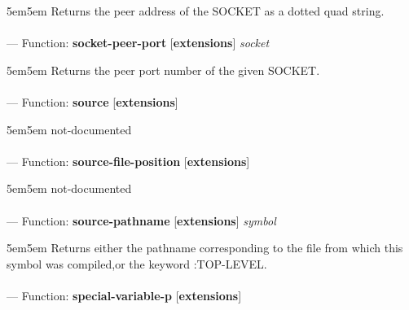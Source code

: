 \begin{adjustwidth}{5em}{5em}
Returns the peer address of the SOCKET as a dotted quad string.
\end{adjustwidth}

\paragraph{}
\label{EXTENSIONS:SOCKET-PEER-PORT}
--- Function: \textbf{socket-peer-port} [\textbf{extensions}] \textit{socket}

\begin{adjustwidth}{5em}{5em}
Returns the peer port number of the given SOCKET.
\end{adjustwidth}

\paragraph{}
\label{EXTENSIONS:SOURCE}
--- Function: \textbf{source} [\textbf{extensions}] \textit{}

\begin{adjustwidth}{5em}{5em}
not-documented
\end{adjustwidth}

\paragraph{}
\label{EXTENSIONS:SOURCE-FILE-POSITION}
--- Function: \textbf{source-file-position} [\textbf{extensions}] \textit{}

\begin{adjustwidth}{5em}{5em}
not-documented
\end{adjustwidth}

\paragraph{}
\label{EXTENSIONS:SOURCE-PATHNAME}
--- Function: \textbf{source-pathname} [\textbf{extensions}] \textit{symbol}

\begin{adjustwidth}{5em}{5em}
Returns either the pathname corresponding to the file from which this symbol was compiled,or the keyword :TOP-LEVEL.
\end{adjustwidth}

\paragraph{}
\label{EXTENSIONS:SPECIAL-VARIABLE-P}
--- Function: \textbf{special-variable-p} [\textbf{extensions}] \textit{}


